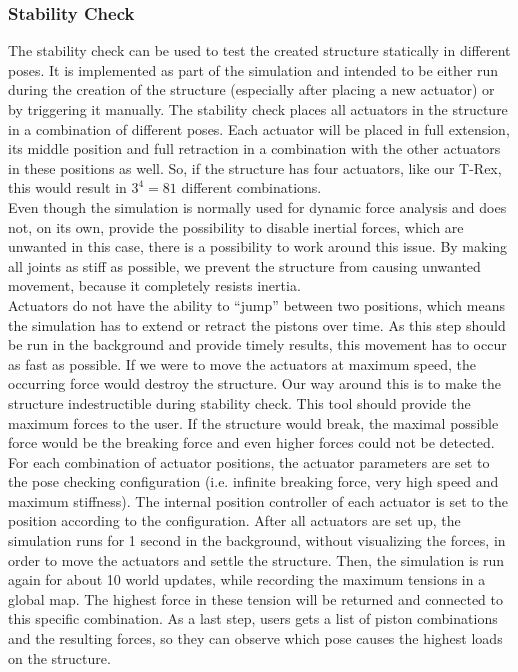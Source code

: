 \subsubsection{Stability Check}
The stability check can be used to test the created structure statically in different poses. It is implemented as part of the simulation and intended to be either run during the creation of the structure (especially after placing a new actuator) or by triggering it manually. The stability check places all actuators in the structure in a combination of different poses. Each actuator will be placed in full extension, its middle position and full retraction in a combination with the other actuators in these positions as well. So, if the structure has four actuators, like our T-Rex, this would result in $3 ^ 4 = 81$ different combinations.\\
Even though the simulation is normally used for dynamic force analysis and does not, on its own, provide the possibility to disable inertial forces, which are unwanted in this case, there is a possibility to work around this issue. By making all joints as stiff as possible, we prevent the structure from causing unwanted movement, because it completely resists inertia.\\
Actuators do not have the ability to ``jump'' between two positions, which means the simulation has to extend or retract the pistons over time. As this step should be run in the background and provide timely results, this movement has to occur as fast as possible. If we were to move the actuators at maximum speed, the occurring force would destroy the structure. Our way around this is to make the structure indestructible during stability check. This tool should provide the maximum forces to the user. If the structure would break, the maximal possible force would be the breaking force and even higher forces could not be detected.\\
For each combination of actuator positions, the actuator parameters are set to the pose checking configuration (i.e. infinite breaking force, very high speed and maximum stiffness). The internal position controller of each actuator is set to the position according to the configuration. After all actuators are set up, the simulation runs for 1 second in the background, without visualizing the forces, in order to move the actuators and settle the structure. Then, the simulation is run again for about 10 world updates, while recording the maximum tensions in a global map. The highest force in these tension will be returned and connected to this specific combination. As a last step, users gets a list of piston combinations and the resulting forces, so they can observe which pose causes the highest loads on the structure.

